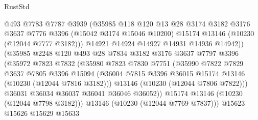 \begin{lexlean}{RustStd}
\begin{coremodule}
                          @493
                          @7783
                          @7787
                          @3939
                          (@35985
                            @118
                            @120
                            @13
                            @28
                            @3174
                            @3182
                            @3176
                            @3637
                            @7776
                            @3396
                            (@15042 @3174 @15046 @10200)
                            @15174
                            @13146
                            (@10230 (@12044 @7777 @3182)))
                          @14921
                          @14924
                          @14927
                          @14931
                          @14936
                          @14942))
                      (@35985
                        @2248
                        @120
                        @493
                        @28
                        @7834
                        @3182
                        @3176
                        @3637
                        @7797
                        @3396
                        (@35972
                          @7823
                          @7832
                          (@35980
                            @7823
                            @7830
                            @7751
                            (@35990
                              @7822
                              @7829
                              @3637
                              @7805
                              @3396
                              @15094
                              (@36004
                                @7815
                                @3396
                                @36015
                                @15174
                                @13146
                                (@10230 (@12044 @7816 @3182)))
                              @13146
                              (@10230 (@12044 @7806 @7822)))
                            @36031
                            @36034
                            @36037
                            @36041
                            @36046
                            @36052))
                        @15174
                        @13146
                        (@10230 (@12044 @7798 @3182)))
                      @13146
                      (@10230 (@12044 @7769 @7837)))
                    @15623
                    @15626
                    @15629
                    @15633

\end{coremodule}
\end{lexlean}
